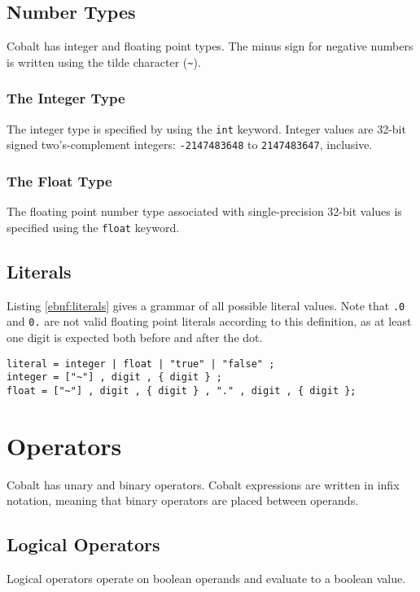 \documentclass[a4paper,appendixprefix]{scrreprt}
\begin{document}
\section{Number Types}
Cobalt has integer and floating point types. The minus sign for negative numbers is written using the tilde character (\verb!~!).

\subsection{The Integer Type}
The integer type is specified by using the \verb!int! keyword. Integer values are 32-bit signed two's-complement integers: \verb!-2147483648! to \verb!2147483647!, inclusive.

\subsection{The Float Type}
The floating point number type associated with single-precision 32-bit values is specified using the \verb!float! keyword.

\section{Literals}
Listing \ref{ebnf:literals} gives a grammar of all possible literal values. Note that \verb!.0! and \verb!0.! are not valid floating point literals according to this definition, as at least one digit is expected both before and after the dot.

\begin{lstlisting}[label={ebnf:literals},caption={Literals Grammar}]
literal = integer | float | "true" | "false" ;
integer = ["~"] , digit , { digit } ;
float = ["~"] , digit , { digit } , "." , digit , { digit };
\end{lstlisting}

\chapter{Operators}\label{operators}
Cobalt has unary and binary operators. Cobalt expressions are written in infix notation, meaning that binary operators are placed between operands.

\section{Logical Operators}
Logical operators operate on boolean operands and evaluate to a boolean value.
\end{document}
